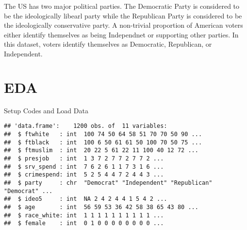 \documentclass[]{article}
\newenvironment{Shaded}{\begin{snugshade}}{\end{snugshade}}
\newcommand{\KeywordTok}[1]{\textcolor[rgb]{0.13,0.29,0.53}{\textbf{{#1}}}}
\newcommand{\DataTypeTok}[1]{\textcolor[rgb]{0.13,0.29,0.53}{{#1}}}
\newcommand{\DecValTok}[1]{\textcolor[rgb]{0.00,0.00,0.81}{{#1}}}
\newcommand{\StringTok}[1]{\textcolor[rgb]{0.31,0.60,0.02}{{#1}}}
\newcommand{\CommentTok}[1]{\textcolor[rgb]{0.56,0.35,0.01}{\textit{{#1}}}}
\newcommand{\OtherTok}[1]{\textcolor[rgb]{0.56,0.35,0.01}{{#1}}}
\newcommand{\NormalTok}[1]{{#1}}
\begin{document}
The US has two major political parties. The Democratic Party is
considered to be the ideologically libearl party while the Republican
Party is considered to be the ideologically conservative party. A
non-trivial proportion of American voters either identify themselves as
being Independnet or supporting other parties. In this dataset, voters
identify themselves as Democratic, Republican, or Independent.

\section{EDA}\label{eda}

Setup Codes and Load Data

\begin{Shaded}
\end{Shaded}

\begin{verbatim}
## 'data.frame':    1200 obs. of  11 variables:
##  $ ftwhite   : int  100 74 50 64 58 51 70 70 50 90 ...
##  $ ftblack   : int  100 6 50 61 61 50 100 70 50 75 ...
##  $ ftmuslim  : int  20 22 5 61 22 11 100 40 12 72 ...
##  $ presjob   : int  1 3 7 2 7 7 2 7 7 2 ...
##  $ srv_spend : int  7 6 2 6 1 1 7 3 1 6 ...
##  $ crimespend: int  5 2 5 4 4 7 2 4 4 3 ...
##  $ party     : chr  "Democrat" "Independent" "Republican" "Democrat" ...
##  $ ideo5     : int  NA 2 4 2 4 4 1 5 4 2 ...
##  $ age       : int  56 59 53 36 42 58 38 65 43 80 ...
##  $ race_white: int  1 1 1 1 1 1 1 1 1 1 ...
##  $ female    : int  0 1 0 0 0 0 0 0 0 0 ...
\end{verbatim}
\end{document}
